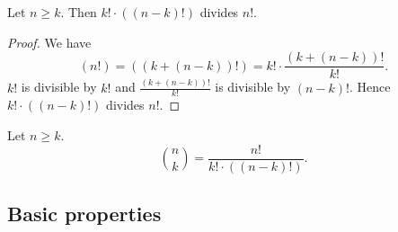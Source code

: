 \documentclass[../../arithmetic.ftl.tex]{subfiles}
\begin{document}
\begin{forthel}
    \begin{lemma}\label{Arithmetic_03_06_504192}
      Let $n \geq k$.
      Then $k! \cdot ((n - k)!)$ divides $n!$.
    \end{lemma}
    \begin{proof}
      We have \[ (n!) = ((k + (n - k))!) = k! \cdot \frac{(k + (n - k))!}{k!}. \]
      $k!$ is divisible by $k!$ and $\frac{(k + (n - k))!}{k!}$ is divisible by $(n - k)!$.
      Hence $k! \cdot ((n - k)!)$ divides $n!$.
    \end{proof}

    \begin{definition}
      Let $n \geq k$.
      \[ \binom{n}{k} = \frac{n!}{k! \cdot ((n - k)!)}. \]
    \end{definition}
  \end{forthel}


  \subsection{Basic properties}
\end{document}
